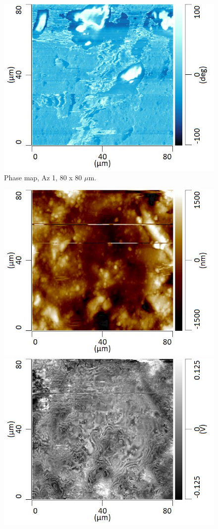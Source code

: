 \begin{figure}[H]
\centering
  \includegraphics[width=.45\textwidth]{Az1_tapping_mode_240521_phase_1}
\caption[Phase map, Az 1]{Phase map, Az 1, 80 x 80 $\mu$m.}
\label{fig:afm_az1_phase_1}
\end{figure}


\begin{figure}[H]
\centering
\begin{minipage}{.45\textwidth}
  \centering
  \includegraphics[width=\linewidth]{Az1_tapping_mode_240521_height_4}
\end{minipage}
\begin{minipage}{.45\textwidth}
  \centering
  \includegraphics[width=\linewidth]{Az1_tapping_mode_240521_def_4}

\end{minipage}
\end{figure}
